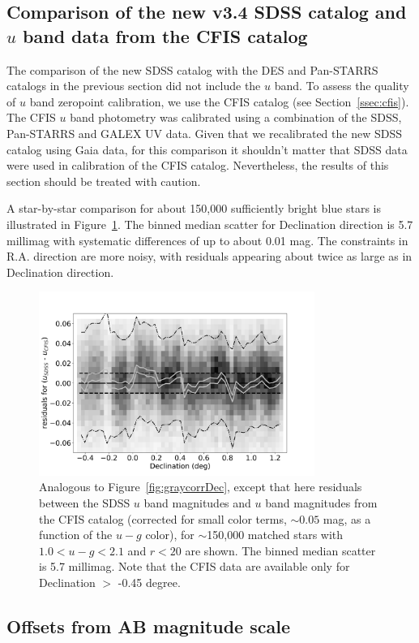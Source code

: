 \subsection{Comparison of the new v3.4 SDSS catalog and $u$ band data from the CFIS catalog  \label{sec:CFIStest}} 

The comparison of the new SDSS catalog with the DES and Pan-STARRS catalogs in the previous
section did not include the $u$ band. To assess the quality of $u$ band zeropoint calibration, 
we use the CFIS catalog (see Section~\ref{ssec:cfis}). The CFIS $u$ band photometry was 
calibrated using a combination of the SDSS, Pan-STARRS and GALEX UV data. Given that
we recalibrated the new SDSS catalog using Gaia data, for this comparison it shouldn't 
matter that SDSS data were used in calibration of the CFIS catalog. Nevertheless, the
results of this section should be treated with caution. 

A star-by-star comparison for about 150,000 sufficiently bright blue stars is illustrated in 
Figure~\ref{fig:CFIS}. The binned median scatter for Declination direction is 5.7 millimag with 
systematic differences of up to about 0.01 mag. The constraints in R.A. direction are more noisy, 
with residuals appearing about twice as large as in Declination direction. 
 
\begin{figure}[th!]
    \centering\includegraphics[width=9cm]{figures/colorResidCFISug_Dec_Hess.png} 
\caption{Analogous to Figure~\ref{fig:graycorrDec}, except that here residuals 
between the SDSS $u$ band magnitudes and $u$ band magnitudes from the CFIS
catalog (corrected for small color terms, $\sim0.05$ mag, as a function of the $u-g$ color),
for $\sim$150,000 matched stars with $1.0 <u-g < 2.1$ and $r<20$ are shown. 
The binned median scatter is 5.7 millimag. Note that the CFIS data are available
only for Declination $>$ -0.45 degree.}
\label{fig:CFIS}
\end{figure}




\subsection{Offsets from AB magnitude scale \label{sec:AB}} 



